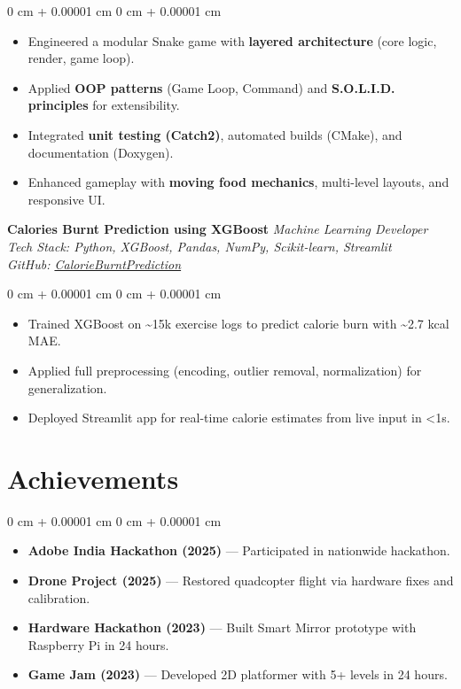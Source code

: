 \documentclass[11pt, a4paper]{article}
\newenvironment{highlights}{
    \begin{itemize}[
        topsep=0.10 cm,
        parsep=0.10 cm,
        partopsep=0pt,
        itemsep=0pt,
        leftmargin=0 cm + 10pt
    ]
}{
    \end{itemize}
} %
\newenvironment{onecolentry}{
    \begin{adjustwidth}{
        0 cm + 0.00001 cm
    }{
        0 cm + 0.00001 cm
    }
}{
    \end{adjustwidth}
} %
\begin{document}
\vspace{0.1cm}

\begin{onecolentry}
    \begin{highlights}
        \item Engineered a modular Snake game with \textbf{layered architecture} (core logic, render, game loop).
        \item Applied \textbf{OOP patterns} (Game Loop, Command) and \textbf{S.O.L.I.D. principles} for extensibility.
        \item Integrated \textbf{unit testing (Catch2)}, automated builds (CMake), and documentation (Doxygen).
        \item Enhanced gameplay with \textbf{moving food mechanics}, multi-level layouts, and responsive UI.
    \end{highlights}
\end{onecolentry}

\vspace{0.3cm}
\textbf{Calories Burnt Prediction using XGBoost} \hfill \textit{Machine Learning Developer} \\
\textit{Tech Stack: Python, XGBoost, Pandas, NumPy, Scikit-learn, Streamlit} \\
\textit{GitHub: \href{https://github.com/dhruvicious/CalorieBurntPrediction}{CalorieBurntPrediction}}

\vspace{0.1cm}
\begin{onecolentry}
    \begin{highlights}
        \item Trained XGBoost on \textasciitilde15k exercise logs to predict calorie burn with \textasciitilde2.7 kcal MAE.
        \item Applied full preprocessing (encoding, outlier removal, normalization) for generalization.
        \item Deployed Streamlit app for real-time calorie estimates from live input in <1s.
    \end{highlights}
\end{onecolentry}

\vspace{0.1cm}
\section{Achievements}

\begin{onecolentry}
    \begin{highlights}
        \item \textbf{Adobe India Hackathon (2025)} — Participated in nationwide hackathon.
        \item \textbf{Drone Project (2025)} — Restored quadcopter flight via hardware fixes and calibration.
        \item \textbf{Hardware Hackathon (2023)} — Built Smart Mirror prototype with Raspberry Pi in 24 hours.
        \item \textbf{Game Jam (2023)} — Developed 2D platformer with 5+ levels in 24 hours.
    \end{highlights}
\end{onecolentry}
\end{document}
